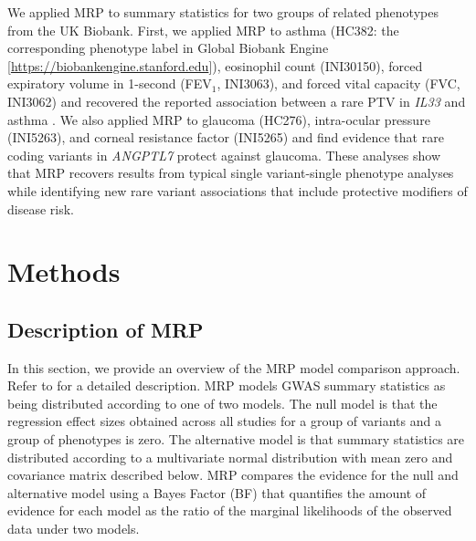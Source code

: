 We applied MRP to summary statistics for two groups of related phenotypes from the UK Biobank. First, we applied MRP to asthma (HC382: the corresponding phenotype label in Global Biobank Engine [\url{https://biobankengine.stanford.edu}]), eosinophil count (INI30150), forced expiratory volume in 1-second (FEV$_1$, INI3063), and forced vital capacity (FVC, INI3062) and recovered the reported association between a rare PTV in \textit{IL33} and asthma \cite{DeBoever179762, 10.1371/journal.pgen.1006659}. We also applied MRP to glaucoma (HC276), intra-ocular pressure (INI5263), and corneal resistance factor (INI5265) and find evidence that rare coding variants in \textit{ANGPTL7} protect against glaucoma. These analyses show that MRP recovers results from typical single variant-single phenotype analyses while identifying new rare variant associations that include protective modifiers of disease risk.

\section*{Methods}

\subsection*{Description of MRP}
In this section, we provide an overview of the MRP model comparison approach. Refer to  for a detailed description. MRP models GWAS summary statistics as being distributed according to one of two models. The null model is that the regression effect sizes obtained across all studies for a group of variants and a group of phenotypes is zero. The alternative model is that summary statistics are distributed according to a multivariate normal distribution with mean zero and covariance matrix described below. MRP compares the evidence for the null and alternative model using a Bayes Factor (BF) that quantifies the amount of evidence for each model as the ratio of the marginal likelihoods of the observed data under two models. 

